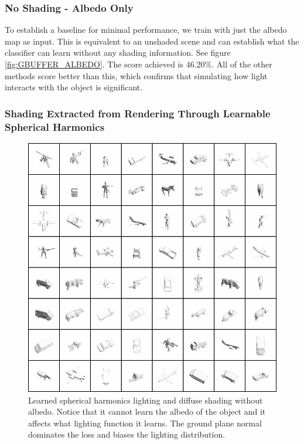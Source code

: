 \documentclass[10pt,twocolumn,letterpaper]{article}
\begin{document}
\subsubsection{No Shading - Albedo Only}
To establish a baseline for minimal performance, we train with just the albedo map as input.  This is equivalent to an unshaded scene and can establish what the classifier can learn without any shading information. See figure \ref{fig:GBUFFER_ALBEDO}.  The score achieved is 46.20\%. All of the other methods score better than this, which confirms that simulating how light interacts with the object is significant.
\subsubsection{Shading Extracted from Rendering Through Learnable Spherical Harmonics}\label{sec:learned_sh}
\begin{figure}[h!]
\centering
\includegraphics[trim={0 0 392px 687px},clip,width=1.0\columnwidth]{./assets/SH_LitTrainingData.jpg}
\caption{Learned spherical harmonics lighting and diffuse shading without albedo.  Notice that it cannot learn the albedo of the object and it affects what lighting function it learns.  The ground plane normal dominates the loss and biases the lighting distribution.}
\label{fig:SH_ONLY}
\end{figure}
\end{document}
